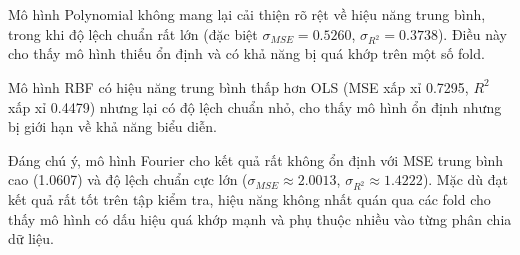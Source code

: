 Mô hình Polynomial không mang lại cải thiện rõ rệt về hiệu năng trung bình,
trong khi độ lệch chuẩn rất lớn (đặc biệt $\sigma_{MSE} = 0.5260$,
$\sigma_{R^2} = 0.3738$). Điều này cho thấy mô hình thiếu ổn định và có khả
năng bị quá khớp trên một số fold.

Mô hình RBF có hiệu năng trung bình thấp hơn OLS (MSE xấp xỉ 0.7295, $R^2$
xấp xỉ 0.4479) nhưng lại có độ lệch chuẩn nhỏ, cho thấy mô hình ổn định nhưng
bị giới hạn về khả năng biểu diễn.

Đáng chú ý, mô hình Fourier cho kết quả rất không ổn định với MSE trung bình
cao (1.0607) và độ lệch chuẩn cực lớn ($\sigma_{MSE} \approx 2.0013$,
$\sigma_{R^2} \approx 1.4222$). Mặc dù đạt kết quả rất tốt trên tập kiểm tra,
hiệu năng không nhất quán qua các fold cho thấy mô hình có dấu hiệu quá khớp
mạnh và phụ thuộc nhiều vào từng phân chia dữ liệu.

